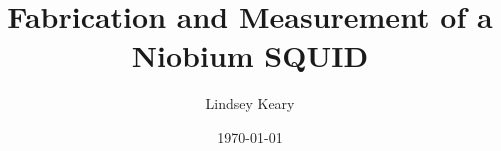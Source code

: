\documentclass[
 a4paper,twocolumn,showpacs,aip,groupedaddress,%
  eqsecnum,notitlepage,showkeys,cha,longbibliography,10pt
]{revtex4-1}
\begin{document}
\title{\LARGE{Fabrication and Measurement of a Niobium SQUID}}

\author{Lindsey Keary}
\date{\today}

\begin{footnotesize}

\end{footnotesize}

\maketitle

% 
\begin{footnotesize}




\end{footnotesize}



\tiny

\end{document}

